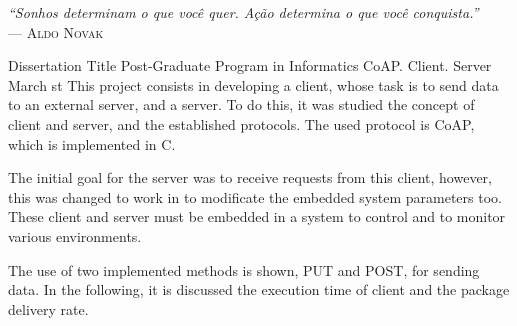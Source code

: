 \documentclass[tg]{mdtufsm}
\begin{document}
\clearpage
\begin{flushright}
\mbox{}\vfill
{\sffamily\itshape
``Sonhos determinam o que você quer. Ação determina o que você conquista.'' \\ }
--- \textsc{Aldo Novak}
\end{flushright}


\begin{abstract}
Este projeto consiste no desenvolvimento de um cliente, cuja tarefa é enviar um dado a um servidor externo, e um servidor, cujo objetivo inicial era receber pedidos desse cliente. Para isso foi feita estudado o conceito de cliente e servidor, assim como os padrões estabelecidos.

O padrão adotado é o CoAP e implementado na linguagem C. Porém, ele foi alterado para que servisse também à alteração de parâmetros do cliente embarcado.  Estes cliente e servidor devem ser embarcados em um hardware para uso de controle e monitoração de diversos ambientes.

É demonstrado também o uso de dois métodos implementados, PUT e POST, no envio de dados. A seguir, apresenta-se a discussão sobre a questão de tempo de execução e de taxa de entrega de pacotes.
\end{abstract}

\begin{englishabstract}
{Dissertation Title}
{Post-Graduate Program in Informatics}
{CoAP. Client. Server}
{March}
{st}
This project consists in developing a client, whose task is to send data to an external server, and a server. To do this, it was studied the concept of client and server, and the established protocols. The used protocol is CoAP, which is implemented in C.

The initial goal for the server was to receive requests from this client, however, this was changed to work in to modificate the embedded system parameters too. These client and server must be embedded in a system to control and to monitor various environments.

The use of two implemented methods is shown, PUT and POST, for sending data. In the following, it is discussed the execution time of client and the package delivery rate.
\end{englishabstract}
\end{document}
